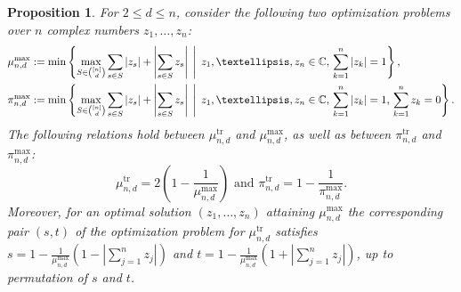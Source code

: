 \documentclass[10pt,a4paper]{amsart}
\newtheorem{proposition}{Proposition}
\def\CC{\mathbb{C}}
\newcommand{\suchthat}{\;\ifnum\currentgrouptype=16 \middle\fi|\;}
\def\tr{\operatorname{tr}}
\begin{document}
\begin{proposition}\label{prop: equivalences}
For $2 \leq d \leq n$, consider the following two optimization problems over $n$ complex numbers $z_1,\dots,z_n$:
    \begin{align*}
    \mu_{n,d}^{\max}  & :=   \min\left\{\max_{S\in\binom{[n]}d}\sum_{s\in S}|z_s|+\left|\sum_{s\in S} z_s\right|\,\suchthat\,z_1,\dots,z_n\in\CC,\, \sum_{k=1}^n|z_k|=1\right\}, \\
    \pi_{n,d}^{\max} & :=  
    \min\left\{\max_{S\in\binom{[n]}d}\sum_{s\in S}|z_s|+\left|\sum_{s\in S} z_s\right|\,\suchthat\,z_1,\dots,z_n\in\CC,\, \sum_{k=1}^n|z_k|=1,\, \sum_{k=1}^n z_k=0\right\}.    
    \end{align*} 
    The following relations hold between $\mu_{n,d}^{\tr}$ and $ \mu_{n,d}^{\max}$, as well as between $\pi_{n,d}^{\tr}$ and $ \pi_{n,d}^{\max}$: 
    \[ \mu_{n,d}^{\tr} = 2 \left( 1- \frac{1}{\mu_{n,d}^{\max}}\right) \text{ and } \pi_{n,d}^{\tr} = 1- \frac{1}{\pi_{n,d}^{\max}}.\]
    Moreover, for an optimal solution $(z_1,\dots,z_n)$ attaining $\mu_{n,d}^{\max}$ the corresponding pair $(s,t)$ of the optimization problem for $\mu_{n,d}^{\operatorname{tr}}$ satisfies $s=1-\frac{1}{\mu_{n,d}^{\max}}(1-|\sum_{j=1}^n z_j|)$ and $t=1-\frac{1}{\mu_{n,d}^{\max}}(1+|\sum_{j=1}^n z_j|)$, up to permutation of $s$ and $t$.
\end{proposition}
\end{document}

